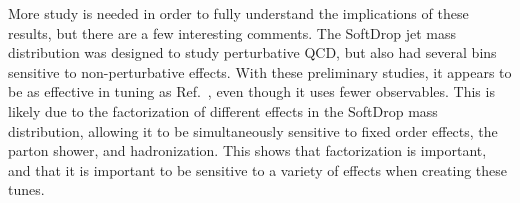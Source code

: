 More study is needed in order to fully understand the implications of these results, but there are a few interesting comments. 
The SoftDrop jet mass distribution was designed to study perturbative QCD, but also had several bins sensitive to non-perturbative effects. 
With these preliminary studies, it appears to be as effective in tuning as Ref.~\cite{Aaboud:2019aii}, even though it uses fewer observables. 
This is likely due to the factorization of different effects in the SoftDrop mass distribution, allowing it to be simultaneously sensitive to fixed order effects, the parton shower, and hadronization. 
This shows that factorization is important, and that it is important to be sensitive to a variety of effects when creating these tunes.





